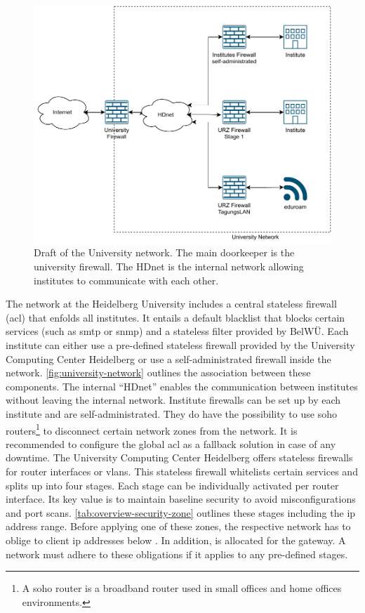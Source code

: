 \begin{figure}
    \centering
    \includegraphics[width=\textwidth]{figures/university-network.pdf}
    \caption[Draft of the University network]{
        Draft of the University network.
        The main doorkeeper is the university firewall.
        The HDnet is the internal network allowing institutes to communicate with each other.
    }
    \label{fig:university-network}
\end{figure}

The network at the Heidelberg University includes a central stateless firewall (\ac{acl}) that enfolds all institutes.
It entails a default blacklist that blocks certain services (such as \ac{smtp} or \ac{snmp}) and a stateless filter provided by BelWÜ.
Each institute can either use a pre-defined stateless firewall provided by the University Computing Center Heidelberg or use a self-administrated firewall inside the network.
\autoref{fig:university-network} outlines the association between these components.
The internal \enquote{HDnet} enables the communication between institutes without leaving the internal network.
Institute firewalls can be set up by each institute and are self-administrated.
They do have the possibility to use \acs{soho} routers\footnote{A \acl{soho} router is a broadband router used in small offices and home offices environments.} to disconnect certain network zones from the network.
It is recommended to configure the global \ac{acl} as a fallback solution in case of any downtime.
The University Computing Center Heidelberg offers stateless firewalls for router interfaces or \acp{vlan}.
This stateless firewall whitelists certain services and splits up into four stages.
Each stage can be individually activated per router interface.
Its key value is to maintain baseline security to avoid misconfigurations and port scans.
\autoref{tab:overview-security-zone} outlines these stages including the \ac{ip} address range.
Before applying one of these zones, the respective network has to oblige to client \ac{ip} addresses below .
In addition,  is allocated for the gateway.
A network must adhere to these obligations if it applies to any pre-defined stages.

